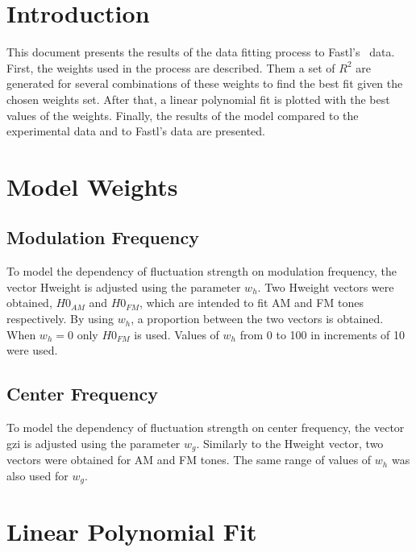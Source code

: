 \documentclass{article}
\begin{document}

\section{Introduction}
\label{sec:introduction}

This document presents the results of the data fitting process to
Fastl's~\cite{Fastl2007Psychoacoustics} data. First, the weights used in the
process are described. Them a set of $R^2$ are generated for several
combinations of these weights to find the best fit given the chosen weights set.
After that, a linear polynomial fit is plotted with the best values of the
weights. Finally, the results of the model compared to the experimental data and
to Fastl's data are presented.

\section{Model Weights}
\label{sec:model_weights}

\subsection{Modulation Frequency}
\label{sub:modulation_frequency}

To model the dependency of fluctuation strength on modulation frequency, the
vector Hweight is adjusted using the parameter $w_h$. Two Hweight vectors were
obtained, $H0_{AM}$ and $H0_{FM}$, which are intended to fit AM and FM tones
respectively. By using $w_h$, a proportion between the two vectors is obtained.
When $w_h=0$ only $H0_{FM}$ is used. Values of $w_h$ from 0 to 100 in
increments of 10 were used.

\subsection{Center Frequency}
\label{sub:center_frequency}

To model the dependency of fluctuation strength on center frequency, the vector
gzi is adjusted using the parameter $w_g$. Similarly to the Hweight vector, two
vectors were obtained for AM and FM tones. The same range of values of $w_h$ was
also used for $w_g$.

\section{Linear Polynomial Fit}
\label{sec:linear_polynomial_fit}
\end{document}
